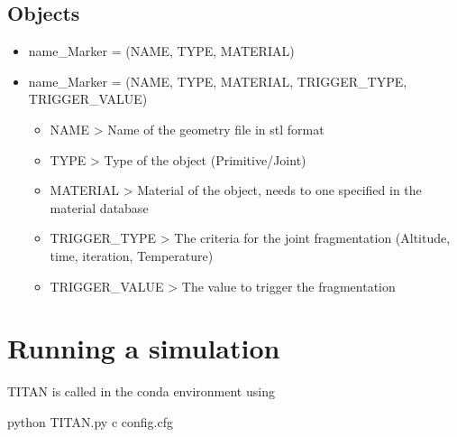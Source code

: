 \documentclass[letterpaper,10pt,english]{sphinxmanual}
\begin{document}
\subsection{Objects}
\label{\detokenize{usage:objects}}\begin{itemize}
\item {} 
\sphinxAtStartPar
{} \sphinxhyphen{} name\_Marker = (NAME, TYPE, MATERIAL)

\item {} 
\sphinxAtStartPar
{} \sphinxhyphen{} name\_Marker = (NAME, TYPE, MATERIAL, TRIGGER\_TYPE, TRIGGER\_VALUE)
\begin{itemize}
\item {} 
\sphinxAtStartPar
NAME \sphinxhyphen{}\textgreater{} Name of the geometry file in stl format

\item {} 
\sphinxAtStartPar
TYPE \sphinxhyphen{}\textgreater{} Type of the object (Primitive/Joint)

\item {} 
\sphinxAtStartPar
MATERIAL \sphinxhyphen{}\textgreater{} Material of the object, needs to one specified in the material database

\item {} 
\sphinxAtStartPar
TRIGGER\_TYPE  \sphinxhyphen{}\textgreater{} The criteria for the joint fragmentation (Altitude, time, iteration, Temperature)

\item {} 
\sphinxAtStartPar
TRIGGER\_VALUE \sphinxhyphen{}\textgreater{} The value to trigger the fragmentation

\end{itemize}

\end{itemize}


\section{Running a simulation}
\label{\detokenize{usage:running-a-simulation}}
\sphinxAtStartPar
TITAN is called in the conda environment using

\begin{sphinxVerbatim}[commandchars=\\\{\}]
 python TITAN.py \PYGZhy{}c config.cfg
\end{sphinxVerbatim}
\end{document}
